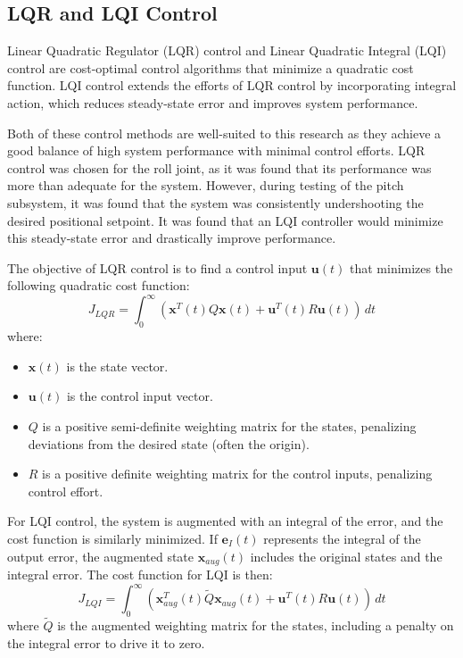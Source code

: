 \subsection{LQR and LQI Control}

Linear Quadratic Regulator (LQR) control and Linear Quadratic Integral (LQI) control are cost-optimal control algorithms that minimize a quadratic cost function. LQI control extends the efforts of LQR control by incorporating integral action, which reduces steady-state error and improves system performance.

Both of these control methods are well-suited to this research as they achieve a good balance of high system performance with minimal control efforts. LQR control was chosen for the roll joint, as it was found that its performance was more than adequate for the system. However, during testing of the pitch subsystem, it was found that the system was consistently undershooting the desired positional setpoint. It was found that an LQI controller would minimize this steady-state error and drastically improve performance.

The objective of LQR control is to find a control input $\mathbf{u}(t)$ that minimizes the following quadratic cost function:
$$ J_{LQR} = \int_{0}^{\infty} (\mathbf{x}^T(t) Q \mathbf{x}(t) + \mathbf{u}^T(t) R \mathbf{u}(t)) \, dt $$
where:
\begin{itemize}
    \item $\mathbf{x}(t)$ is the state vector.
    \item $\mathbf{u}(t)$ is the control input vector.
    \item $Q$ is a positive semi-definite weighting matrix for the states, penalizing deviations from the desired state (often the origin).
    \item $R$ is a positive definite weighting matrix for the control inputs, penalizing control effort.
\end{itemize}

For LQI control, the system is augmented with an integral of the error, and the cost function is similarly minimized. If $\mathbf{e}_I(t)$ represents the integral of the output error, the augmented state $\mathbf{x}_{aug}(t)$ includes the original states and the integral error. The cost function for LQI is then:
$$ J_{LQI} = \int_{0}^{\infty} (\mathbf{x}_{aug}^T(t) \tilde{Q} \mathbf{x}_{aug}(t) + \mathbf{u}^T(t) R \mathbf{u}(t)) \, dt $$
where $\tilde{Q}$ is the augmented weighting matrix for the states, including a penalty on the integral error to drive it to zero.

